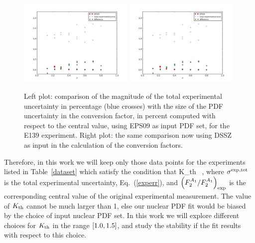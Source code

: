 \begin{figure}[t]
\begin{center}
  \includegraphics[width=0.49\textwidth]{plots/au_e139.pdf}
  \includegraphics[width=0.49\textwidth]{plots/au_e139.pdf}
\end{center}
\vspace{-0.3cm}
\caption{\small Left plot: comparison of the magnitude
  of the total experimental uncertainty in
  percentage (blue crosses)
  with the size of the PDF uncertainty in the conversion
  factor, in percent computed with respect to the
  central value, using EPS09 as input PDF set, for
  the E139 experiment.
  Right plot: the same comparison now using DSSZ as input
  in the calculation of the conversion factors.
}
\label{fig1aue139}
\end{figure}

Therefore, in this work we will keep only those data points
for the experiments listed in Table~\ref{dataset} which satisfy the
condition that
\be
{} \le K_{\rm th} \cdot {} \,  ,
\ee
where $\sigma^{\rm exp,tot}$ is the total experimental uncertainty,
Eq.~(\ref{experr}), and   $\left( F_2^{A_1}/F_2^{A_1}\right)_{\rm exp}$ is the
corresponding central value of the original experimental measurement.
%
The value of $K_{\rm th}$ cannot be much larger than 1, else our
nuclear PDF fit would be biased by the choice of input
nuclear PDF set.
%
In this work we will explore different choices for
$K_{\rm th}$ in the range $\left[ 1.0,1.5\right]$, and study the stability
if the fit results with respect to this choice.

